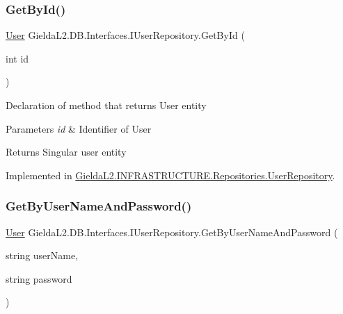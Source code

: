 \mbox{\label{interface_gielda_l2_1_1_d_b_1_1_interfaces_1_1_i_user_repository_ae3b2e6d986054c6b336887b4d0d1cfac}} 
\subsubsection{\texorpdfstring{GetById()}{GetById()}}
{\footnotesize\ttfamily \mbox{\hyperlink{class_gielda_l2_1_1_d_b_1_1_entities_1_1_user}{User}} Gielda\+L2.\+D\+B.\+Interfaces.\+I\+User\+Repository.\+Get\+By\+Id (\begin{DoxyParamCaption}\item[{int}]{id }\end{DoxyParamCaption})}



Declaration of method that returns User entity 


\begin{DoxyParams}{Parameters}
{\em id} & Identifier of User\\
\hline
\end{DoxyParams}
\begin{DoxyReturn}{Returns}
Singular user entity
\end{DoxyReturn}


Implemented in \mbox{\hyperlink{class_gielda_l2_1_1_i_n_f_r_a_s_t_r_u_c_t_u_r_e_1_1_repositories_1_1_user_repository_a59783783c8210efff03a749d4f63fadf}{Gielda\+L2.\+I\+N\+F\+R\+A\+S\+T\+R\+U\+C\+T\+U\+R\+E.\+Repositories.\+User\+Repository}}.

\mbox{\label{interface_gielda_l2_1_1_d_b_1_1_interfaces_1_1_i_user_repository_a8a8920b50795c07316baf914e70f5ee3}} 
\subsubsection{\texorpdfstring{GetByUserNameAndPassword()}{GetByUserNameAndPassword()}}
{\footnotesize\ttfamily \mbox{\hyperlink{class_gielda_l2_1_1_d_b_1_1_entities_1_1_user}{User}} Gielda\+L2.\+D\+B.\+Interfaces.\+I\+User\+Repository.\+Get\+By\+User\+Name\+And\+Password (\begin{DoxyParamCaption}\item[{string}]{user\+Name,  }\item[{string}]{password }\end{DoxyParamCaption})}



